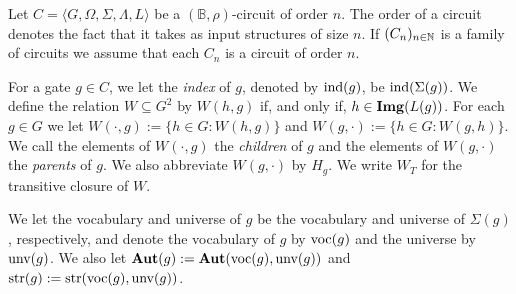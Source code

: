 \documentclass[../paper.tex]{subfiles}
\begin{document}
Let $C = \langle G, \Omega, \Sigma, \Lambda, L \rangle$ be a $(\mathbb{B},
\rho)$-circuit of order $n$. The order of a circuit denotes the fact that it
takes as input structures of size $n$. If $(C_n)_{n \in \mathbb{N}}$ is a family of
circuits we assume that each $C_n$ is a circuit of order $n$.

For a gate $g \in C$, we let the \emph{index} of $g$, denoted by $\text{\upshape ind}(g)$, be
$\text{\upshape ind}(\Sigma(g))$. We define the relation $W \subseteq G^2$ by $W(h,g)$ if, and
only if, $h \in \text{\textbf{Img}}(L(g))$. For each $g \in G$ we let $W(\cdot, g) := \{h \in G
: W(h,g)\}$ and $W(g, \cdot) := \{h \in G : W(g,h)\}$. We call the elements of
$W(\cdot, g)$ the \emph{children} of $g$ and the elements of $W(g, \cdot)$ the
\emph{parents} of $g$. We also abbreviate $W(g, \cdot)$ by $H_g$. We write $W_T$
for the transitive closure of $W$.

We let the vocabulary and universe of $g$ be the vocabulary and universe of
$\Sigma(g)$, respectively, and denote the vocabulary of $g$ by $\text{voc}(g)$ and
the universe by $\text{unv}(g)$. We also let $\text{\textbf{Aut}}(g) := \text{\textbf{Aut}}(\text{voc}(g),
\text{unv}(g))$ and $\text{str}(g) := \text{str}(\text{voc}(g), \text{unv}(g))$.



\end{document}
